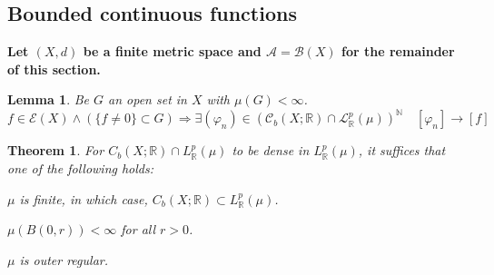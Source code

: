 \documentclass[11pt, a4paper, openany]{book}
\newtheorem{thm}{Theorem}\newtheorem{lem}{Lemma}\newtheorem{crl}{Corollary}
\theoremstyle{definition}
\newenvironment{tight_enumerate}{\begin{enumerate}\itemsep -0.2em}{\end{enumerate}}
\begin{document}
\subsection{Bounded continuous functions}
    \textbf{Let $(X,d)$ be a finite metric space and $\mathscr{A}=\mathscr{B}(X)$ for the remainder of this section.}
    \begin{lem}
        Be $G$ an open set in $X$ with $\mu(G)<\infty$.
        \[f\in\mathcal{E}(X)\wedge (\{f\neq 0\}\subset G)\Longrightarrow\exists (\varphi_n)\in(\mathcal{C}_b(X;\mathbb{R})\cap \mathcal{L}^p_\mathbb{R}(\mu))^\mathbb{N}\quad [\varphi_n]\to[f]\]
    \end{lem}
    \begin{thm}
        For $C_b(X;\mathbb{R})\cap L^p_\mathbb{R}(\mu)$ to be dense in $L^p_\mathbb{R}(\mu)$, it suffices that one of the following holds:
        \begin{tight_enumerate}
            \item $\mu$ is finite, in which case, $C_b(X;\mathbb{R})\subset L^p_\mathbb{R}(\mu)$.
            \item $\mu(B(0,r))<\infty$ for all $r>0$.
            \item $\mu$ is outer regular.
        \end{tight_enumerate}
    \end{thm}
\end{document}
